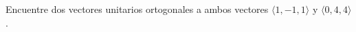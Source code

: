 \item Encuentre dos vectores unitarios ortogonales a ambos vectores $\langle 1, -1, 1 \rangle$ y $\langle 0, 4, 4 \rangle$.

